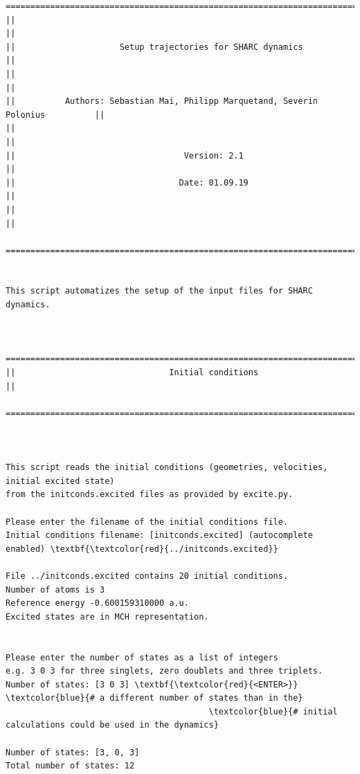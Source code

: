 \documentclass[a4paper,11pt,DIV=15,openany]{scrbook}
\begin{document}
\begin{oframed}
\footnotesize\begin{Verbatim}[commandchars=\\\{\}]
  ================================================================================
||                                                                                ||
||                     Setup trajectories for SHARC dynamics                      ||
||                                                                                ||
||          Authors: Sebastian Mai, Philipp Marquetand, Severin Polonius          ||
||                                                                                ||
||                                  Version: 2.1                                  ||
||                                 Date: 01.09.19                                 ||
||                                                                                ||
  ================================================================================


This script automatizes the setup of the input files for SHARC dynamics.
  

  ================================================================================
||                               Initial conditions                               ||
  ================================================================================



This script reads the initial conditions (geometries, velocities, initial excited state)
from the initconds.excited files as provided by excite.py.

Please enter the filename of the initial conditions file.
Initial conditions filename: [initconds.excited] (autocomplete enabled) \textbf{\textcolor{red}{../initconds.excited}}

File ../initconds.excited contains 20 initial conditions.
Number of atoms is 3
Reference energy -0.600159310000 a.u.
Excited states are in MCH representation.


Please enter the number of states as a list of integers
e.g. 3 0 3 for three singlets, zero doublets and three triplets.
Number of states: [3 0 3] \textbf{\textcolor{red}{<ENTER>}}        \textcolor{blue}{# a different number of states than in the}
                                         \textcolor{blue}{# initial calculations could be used in the dynamics}

Number of states: [3, 0, 3]
Total number of states: 12


\end{Verbatim}
\end{oframed}
\end{document}
